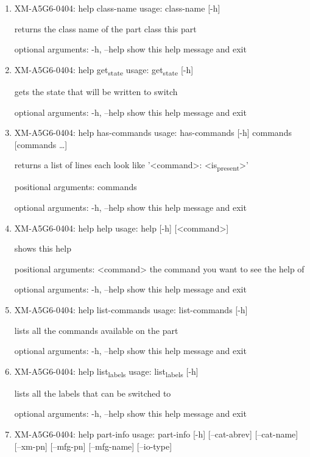 \documentclass[11pt]{article}
\begin{document}
\begin{enumerate}
\item XM-A5G6-0404: help class-name
\label{sec:org5e6efcd}
usage: class-name [-h]

returns the class name of the part class this part

optional arguments:
  -h, --help  show this help message and exit

\item XM-A5G6-0404: help get\textsubscript{state}
\label{sec:org6d4b63d}
usage: get\textsubscript{state} [-h]

gets the state that will be written to switch

optional arguments:
  -h, --help  show this help message and exit

\item XM-A5G6-0404: help has-commands
\label{sec:orgc238cfb}
usage: has-commands [-h] commands [commands \ldots{}]

returns a list of lines each look like '<command>: <is\textsubscript{present}>'

positional arguments:
  commands

optional arguments:
  -h, --help  show this help message and exit

\item XM-A5G6-0404: help help
\label{sec:org8df9dd8}
usage: help [-h] [<command>]

shows this help

positional arguments:
  <command>   the command you want to see the help of

optional arguments:
  -h, --help  show this help message and exit

\item XM-A5G6-0404: help list-commands
\label{sec:orgf0ec60e}
usage: list-commands [-h]

lists all the commands available on the part

optional arguments:
  -h, --help  show this help message and exit

\item XM-A5G6-0404: help list\textsubscript{labels}
\label{sec:org05f9e09}
usage: list\textsubscript{labels} [-h]

lists all the labels that can be switched to

optional arguments:
  -h, --help  show this help message and exit

\item XM-A5G6-0404: help part-info
\label{sec:org50d5131}
usage: part-info  [-h] [--cat-abrev] [--cat-name] [--xm-pn] [--mfg-pn] [--mfg-name]
        [--io-type]


\end{enumerate}
\end{document}
